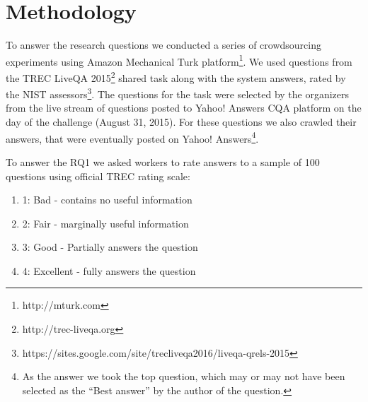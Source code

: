 \documentclass[11pt,letterpaper]{article}
\begin{document}
\section{Methodology}
\label{sec:methodology}

To answer the research questions we conducted a series of crowdsourcing experiments using Amazon Mechanical Turk platform\footnote{http://mturk.com}.
We used questions from the TREC LiveQA 2015\footnote{http://trec-liveqa.org} shared task along with the system answers, rated by the NIST assessors\footnote{https://sites.google.com/site/trecliveqa2016/liveqa-qrels-2015}.
The questions for the task were selected by the organizers from the live stream of questions posted to Yahoo! Answers CQA platform on the day of the challenge (August 31, 2015).
For these questions we also crawled their answers, that were eventually posted on Yahoo! Answers\footnote{As the answer we took the top question, which may or may not have been selected as the ``Best answer'' by the author of the question.}.

To answer the RQ1 we asked workers to rate answers to a sample of 100 questions using official TREC rating scale:
\begin{enumerate}
\item 1: Bad - contains no useful information
\item 2: Fair - marginally useful information
\item 3: Good - Partially answers the question
\item 4: Excellent - fully answers the question
\end{enumerate}
\end{document}

